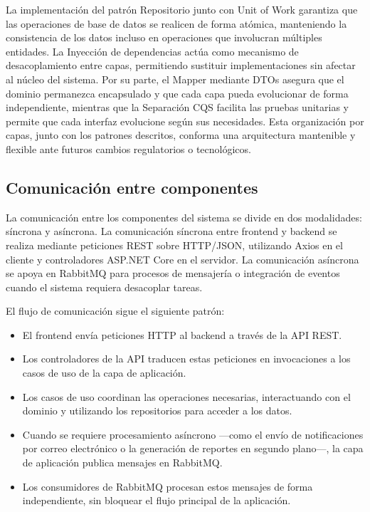 \documentclass[12pt,letterpaper]{article}
\begin{document}
La implementación del patrón Repositorio junto con Unit of Work garantiza que las operaciones de base de datos se realicen de forma atómica, manteniendo la consistencia de los datos incluso en operaciones que involucran múltiples entidades. La Inyección de dependencias actúa como mecanismo de desacoplamiento entre capas, permitiendo sustituir implementaciones sin afectar al núcleo del sistema. Por su parte, el Mapper mediante DTOs asegura que el dominio permanezca encapsulado y que cada capa pueda evolucionar de forma independiente, mientras que la Separación CQS facilita las pruebas unitarias y permite que cada interfaz evolucione según sus necesidades. Esta organización por capas, junto con los patrones descritos, conforma una arquitectura mantenible y flexible ante futuros cambios regulatorios o tecnológicos.

\subsection{Comunicación entre componentes}

La comunicación entre los componentes del sistema se divide en dos modalidades: síncrona y asíncrona. La comunicación síncrona entre frontend y backend se realiza mediante peticiones REST sobre HTTP/JSON, utilizando Axios en el cliente y controladores ASP.NET Core en el servidor. La comunicación asíncrona se apoya en RabbitMQ para procesos de mensajería o integración de eventos cuando el sistema requiera desacoplar tareas.

El flujo de comunicación sigue el siguiente patrón:
\begin{itemize}
\item El frontend envía peticiones HTTP al backend a través de la API REST.
\item Los controladores de la API traducen estas peticiones en invocaciones a los casos de uso de la capa de aplicación.
\item Los casos de uso coordinan las operaciones necesarias, interactuando con el dominio y utilizando los repositorios para acceder a los datos.
\item Cuando se requiere procesamiento asíncrono —como el envío de notificaciones por correo electrónico o la generación de reportes en segundo plano—, la capa de aplicación publica mensajes en RabbitMQ.
\item Los consumidores de RabbitMQ procesan estos mensajes de forma independiente, sin bloquear el flujo principal de la aplicación.
\end{itemize}
\end{document}
